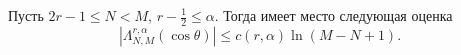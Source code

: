 \begin{lemma} Пусть $2r-1\le N< M$, $r-\frac12\le\alpha$. Тогда имеет место следующая оценка
\begin{equation}\label{sobleg-5.8}
 |\Lambda^{r,\alpha}_{N,M}(\cos\theta)|\le  c(r,\alpha)\ln(M-N+1).
 \end{equation}
\end{lemma}
